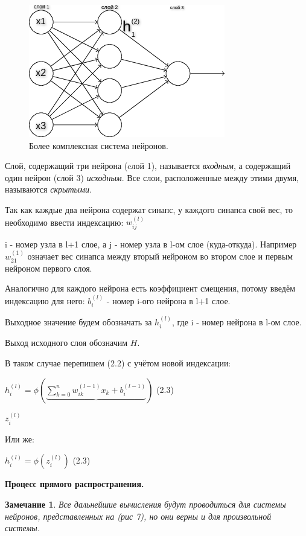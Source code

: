 \documentclass[12pt]{extarticle}
\newtheorem*{remark}{Замечание}
\begin{document}
	\begin{figure}[h]
			\centering
			\includegraphics[width=0.7\linewidth]{neuron_2.png}
			\caption{Более комплексная система нейронов.}
			\label{fig:mpr}
	\end{figure}
	
	Слой, содержащий три нейрона (cлой 1), называется \textit{входным}, а содержащий один нейрон (слой 3) \textit{исходным}. Все слои, расположенные между этими двумя, называются \textit{скрытыми}.
	
	Так как каждые два нейрона содержат синапс, у каждого синапса свой вес, то необходимо ввести индексацию: $w_{ij}^{(l)}$
	
	i - номер узла в l+1 слое, а j - номер узла в l-ом слое (куда-откуда). Например $w_{21}^{(1)}$ означает вес синапса между вторый нейроном во втором слое и первым нейроном первого слоя.
	
	Аналогично для каждого нейрона есть коэффициент смещения, потому введём индексацию для него: $b_i^{(l)}$ - номер i-ого нейрона в l+1 слое.
	
	
	Выходное значение будем обозначать за $h_i^{(l)}$, где i - номер нейрона в l-ом слое.
	
	Выход исходного слоя обозначим $H$. 
	
	В таком случае перепишем (2.2) с учётом новой индексации:
	
	\centerline{$h_i^{(l)} = \displaystyle\phi(\underbrace{\sum_{k=0}^{n}w_{ik}^{(l-1)}x_k + b_i^{(l-1)}})$ (2.3)}
	\centerline{   $z_i^{(l)}$}
	
	Или же:
	
	\centerline{$h_i^{(l)} = \displaystyle\phi(z_i^{(l)})$ (2.3)}
		
	
	\centerline{\textbf{Процесс прямого распространения.}}
	
	\begin{remark}
		Все дальнейшие вычисления будут проводиться для системы нейронов, представленных на (рис 7), но они верны и для произвольной системы.
	\end{remark}
	
\end{document}
